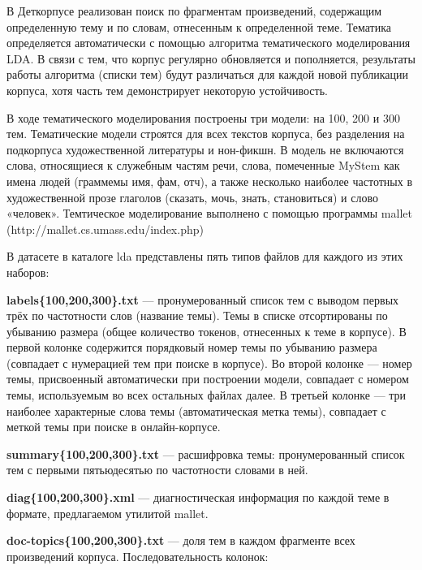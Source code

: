 \documentclass[
]{article}
\begin{document}
В Деткорпусе реализован поиск по фрагментам произведений, содержащим
определенную тему и по словам, отнесенным к определенной теме. Тематика
определяется автоматически с помощью алгоритма тематического
моделирования LDA. В связи с тем, что корпус регулярно обновляется и
пополняется, результаты работы алгоритма (списки тем) будут различаться
для каждой новой публикации корпуса, хотя часть тем демонстрирует
некоторую устойчивость.

В ходе тематического моделирования построены три модели: на 100, 200 и
300 тем. Тематические модели строятся для всех текстов корпуса, без
разделения на подкорпуса художественной литературы и нон-фикшн. В модель
не включаются слова, относящиеся к служебным частям речи, слова,
помеченные MyStem как имена людей (граммемы имя, фам, отч), а также
несколько наиболее частотных в художественной прозе глаголов (сказать,
мочь, знать, становиться) и слово «человек». Темтическое моделирование
выполнено с помощью программы mallet
(http://mallet.cs.umass.edu/index.php)

В датасете в каталоге lda представлены пять типов файлов для каждого из
этих наборов:

\textbf{labels\{100,200,300\}.txt} --- пронумерованный список тем с
выводом первых трёх по частотности слов (название темы). Темы в списке
отсортированы по убыванию размера (общее количество токенов, отнесенных
к теме в корпусе). В первой колонке содержится порядковый номер темы по
убыванию размера (совпадает с нумерацией тем при поиске в корпусе). Во
второй колонке --- номер темы, присвоенный автоматически при построении
модели, совпадает с номером темы, используемым во всех остальных файлах
далее. В третьей колонке --- три наиболее характерные слова темы
(автоматическая метка темы), совпадает с меткой темы при поиске в
онлайн-корпусе.

\textbf{summary\{100,200,300\}.txt} --- расшифровка темы:
пронумерованный список тем с первыми пятьюдесятью по частотности словами
в ней.

\textbf{diag\{100,200,300\}.xml} --- диагностическая информация по
каждой теме в формате, предлагаемом утилитой mallet.

\textbf{doc-topics\{100,200,300\}.txt} --- доля тем в каждом фрагменте
всех произведений корпуса. Последовательность колонок:
\end{document}
